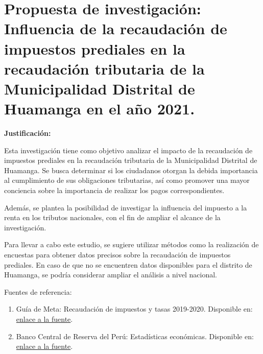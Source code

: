 \documentclass[
  letterpaper,
  DIV=11,
  numbers=noendperiod]{scrartcl}
\begin{document}
\hypertarget{propuesta-de-investigaciuxf3n-influencia-de-la-recaudaciuxf3n-de-impuestos-prediales-en-la-recaudaciuxf3n-tributaria-de-la-municipalidad-distrital-de-huamanga-en-el-auxf1o-2021.}{%
\section{Propuesta de investigación: Influencia de la recaudación de
impuestos prediales en la recaudación tributaria de la Municipalidad
Distrital de Huamanga en el año
2021.}\label{propuesta-de-investigaciuxf3n-influencia-de-la-recaudaciuxf3n-de-impuestos-prediales-en-la-recaudaciuxf3n-tributaria-de-la-municipalidad-distrital-de-huamanga-en-el-auxf1o-2021.}}

\textbf{Justificación:}

Esta investigación tiene como objetivo analizar el impacto de la
recaudación de impuestos prediales en la recaudación tributaria de la
Municipalidad Distrital de Huamanga. Se busca determinar si los
ciudadanos otorgan la debida importancia al cumplimiento de sus
obligaciones tributarias, así como promover una mayor conciencia sobre
la importancia de realizar los pagos correspondientes.

Además, se plantea la posibilidad de investigar la influencia del
impuesto a la renta en los tributos nacionales, con el fin de ampliar el
alcance de la investigación.

Para llevar a cabo este estudio, se sugiere utilizar métodos como la
realización de encuestas para obtener datos precisos sobre la
recaudación de impuestos prediales. En caso de que no se encuentren
datos disponibles para el distrito de Huamanga, se podría considerar
ampliar el análisis a nivel nacional.

Fuentes de referencia:

\begin{enumerate}
\def\labelenumi{\arabic{enumi}.}
\item
  Guía de Meta: Recaudación de impuestos y tasas 2019-2020. Disponible
  en:
  \href{https://www.mef.gob.pe/contenidos/presu_publ/migl/metas/GUIA_META_2_rcaudacion2019_2020.pdf}{enlace
  a la fuente}.
\item
  Banco Central de Reserva del Perú: Estadísticas económicas. Disponible
  en:
  \href{https://estadisticas.bcrp.gob.pe/estadisticas/series/mensuales/resultados/RD13778DM/html}{enlace
  a la fuente}.
\end{enumerate}
\end{document}
